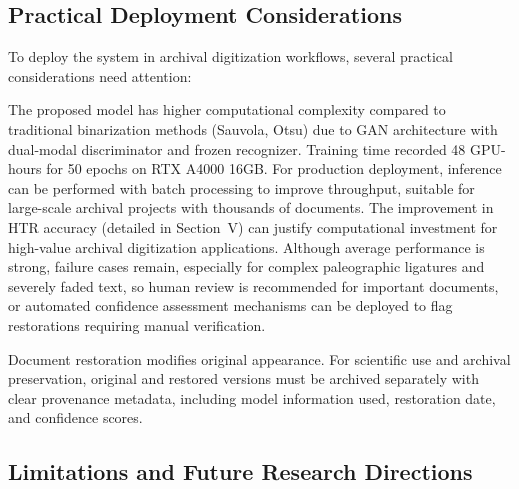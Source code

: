 \documentclass[journal]{IEEEtran}
\begin{document}
\subsection{Practical Deployment Considerations}

To deploy the system in archival digitization workflows, several practical considerations need attention:

The proposed model has higher computational complexity compared to traditional binarization methods (Sauvola, Otsu) due to GAN architecture with dual-modal discriminator and frozen recognizer. Training time recorded 48 GPU-hours for 50 epochs on RTX A4000 16GB. For production deployment, inference can be performed with batch processing to improve throughput, suitable for large-scale archival projects with thousands of documents. The improvement in HTR accuracy (detailed in Section~V) can justify computational investment for high-value archival digitization applications. Although average performance is strong, failure cases remain, especially for complex paleographic ligatures and severely faded text, so human review is recommended for important documents, or automated confidence assessment mechanisms can be deployed to flag restorations requiring manual verification.

Document restoration modifies original appearance. For scientific use and archival preservation, original and restored versions must be archived separately with clear provenance metadata, including model information used, restoration date, and confidence scores.

\subsection{Limitations and Future Research Directions}
\end{document}
